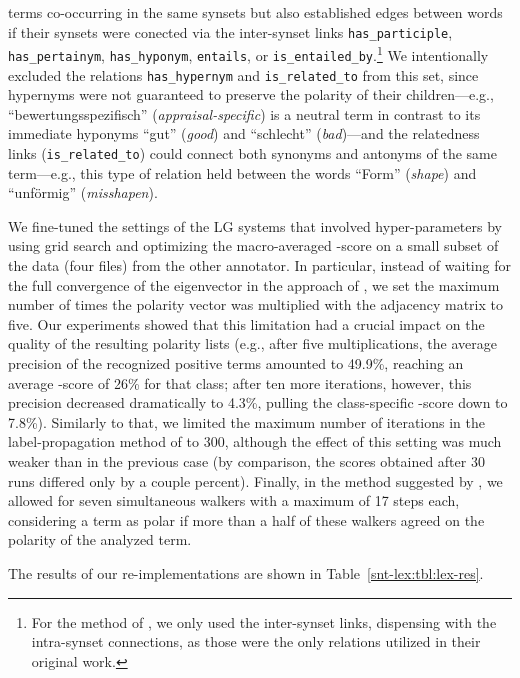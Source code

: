 terms co-occurring in the same synsets but also established edges
between words if their synsets were conected via the inter-synset
links \texttt{has\_participle}, \texttt{has\_pertainym},
\texttt{has\_hyponym}, \texttt{entails}, or
\texttt{is\_entailed\_by}.\footnote{For the method of
  \citet{Esuli:06c}, we only used the inter-synset links, dispensing
  with the intra-synset connections, as those were the only relations
  utilized in their original work.} We intentionally excluded the
relations \texttt{has\_hypernym} and \texttt{is\_related\_to} from
this set, since hypernyms were not guaranteed to preserve the polarity
of their children---e.g., ``bewertungsspezifisch''
(\emph{appraisal-specific}) is a neutral term in contrast to its
immediate hyponyms ``gut'' (\emph{good}) and ``schlecht''
(\emph{bad})---and the relatedness links (\texttt{is\_related\_to})
could connect both synonyms and antonyms of the same term---e.g., this
type of relation held between the words ``Form'' (\emph{shape}) and
``unf\"ormig'' (\emph{misshapen}).

We fine-tuned the settings of the LG systems that involved
hyper-parameters by using grid search and optimizing the
macro-averaged \F{}-score on a small subset of the data (four files)
from the other annotator.  In particular, instead of waiting for the
full convergence of the eigenvector in the approach of
\citet{Blair-Goldensohn:08}, we set the maximum number of times the
polarity vector was multiplied with the adjacency matrix to five.  Our
experiments showed that this limitation had a crucial impact on the
quality of the resulting polarity lists (e.g., after five
multiplications, the average precision of the recognized positive
terms amounted to 49.9\%, reaching an average \F{}-score of 26\% for
that class; after ten more iterations, however, this precision
decreased dramatically to 4.3\%, pulling the class-specific \F{}-score
down to 7.8\%).  Similarly to that, we limited the maximum number of
iterations in the label-propagation method of \citet{Rao:09} to 300,
although the effect of this setting was much weaker than in the
previous case (by comparison, the scores obtained after 30 runs
differed only by a couple percent).  Finally, in the method suggested
by \citet{Awadallah:10}, we allowed for seven simultaneous walkers
with a maximum of 17 steps each, considering a term as polar if more
than a half of these walkers agreed on the polarity of the analyzed
term.

The results of our re-implementations are shown in
Table~\ref{snt-lex:tbl:lex-res}.

